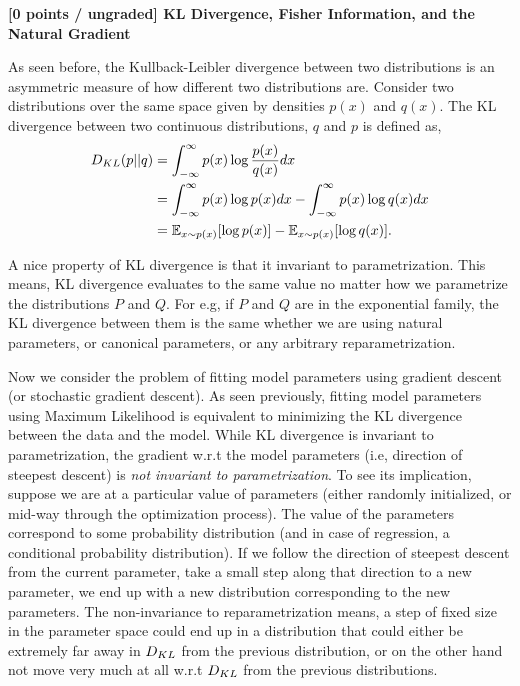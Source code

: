 \newcommand{\argminE}{\mathop{\mathrm{argmi\di}}\limits}          %
\newcommand{\argmaxE}{\mathop{\mathrm{argmax}}\limits}          %


\item {\bf [0 points / ungraded] KL Divergence, Fisher Information, and the Natural Gradient}

As seen before, the Kullback-Leibler divergence between two distributions is an asymmetric measure of how different two distributions are. Consider two distributions over the same space given by densities $p(x)$ and $q(x)$. The KL divergence between two continuous distributions, $q$ and $p$ is defined as,
 \begin{align*}
D_{KL}(p||q)&=\int_{-\infty}^{\infty}p(x)\log\dfrac{p(x)}{q(x)}dx\\
&=\int_{-\infty}^{\infty}p(x)\log p(x)dx-\int_{-\infty}^{\infty}p(x)\log q(x)dx\\
&=\mathbb{E}_{x\sim p(x)}[\log p(x)]-\mathbb{E}_{x\sim p(x)}[\log q(x)].
\end{align*}


A nice property of KL divergence is that it invariant to parametrization. This means, KL divergence
evaluates to the same value no matter how we parametrize the distributions $P$ and $Q$. For e.g,
if $P$ and $Q$ are in the exponential family, the KL divergence between them is the same whether
we are using natural parameters, or canonical parameters, or any arbitrary reparametrization.


Now we consider the problem of fitting model parameters using gradient descent (or stochastic gradient
descent). As seen previously, fitting model parameters using Maximum Likelihood is equivalent
to minimizing the KL divergence between the data and the model. While KL divergence is
invariant to parametrization, the gradient w.r.t the model parameters (i.e, direction
of steepest descent) is \emph{not invariant to parametrization}. To see its implication, suppose
we are at a particular value of parameters (either randomly initialized, or mid-way through
the optimization process). The value of the parameters correspond to some probability distribution
(and in case of regression, a conditional probability distribution).
If we follow the direction of steepest descent from the current parameter, take a small step along that
direction to a new parameter, we end up with a new distribution corresponding to the new parameters.
The non-invariance to reparametrization means, a step of fixed size in the parameter space could
end up in a distribution that could either be extremely far away in $D_{KL}$ from the previous
distribution, or on the other hand not move very much at all w.r.t $D_{KL}$ from the previous
distributions.


